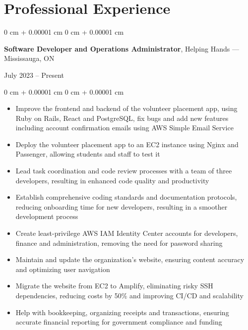 \documentclass[10pt, letterpaper]{article}
\newenvironment{highlights}{
    \begin{itemize}[
        topsep=0.10 cm,
        parsep=0.10 cm,
        partopsep=0pt,
        itemsep=0pt,
        leftmargin=0 cm + 10pt
    ]
}{
    \end{itemize}
} %
\newenvironment{onecolentry}{
    \begin{adjustwidth}{
        0 cm + 0.00001 cm
    }{
        0 cm + 0.00001 cm
    }
}{
    \end{adjustwidth}
} %
\newenvironment{twocolentry}[2][]{
    \onecolentry
    \def\secondColumn{#2}
    \setcolumnwidth{\fill, 4 cm}
    \begin{paracol}{2}
}{
    \switchcolumn \raggedleft \secondColumn
    \end{paracol}
    \endonecolentry
} %
\begin{document}
    \section{Professional Experience}
        \begin{twocolentry}{July 2023 -- Present}
            \textbf{Software Developer and Operations Administrator}, Helping Hands --- Mississauga, ON
        \end{twocolentry}
        \vspace{0.10 cm}
        \begin{onecolentry}
            \begin{highlights}
                \item Improve the frontend and backend of the volunteer placement app, using Ruby on Rails, React and PostgreSQL, fix bugs and add new features including account confirmation emails using AWS Simple Email Service
                \item Deploy the volunteer placement app to an EC2 instance using Nginx and Passenger, allowing students and staff to test it
                \item Lead task coordination and code review processes with a team of three developers, resulting in enhanced code quality and productivity
                \item Establish comprehensive coding standards and documentation protocols, reducing onboarding time for new developers, resulting in a smoother development process
                \item Create least-privilege AWS IAM Identity Center accounts for developers, finance and administration, removing the need for password sharing
                \item Maintain and update the organization's website, ensuring content accuracy and optimizing user navigation
                \item Migrate the website from EC2 to Amplify, eliminating risky SSH dependencies, reducing costs by 50\% and improving CI/CD and scalability
                \item Help with bookkeeping, organizing receipts and transactions, ensuring accurate financial reporting for government compliance and funding
            \end{highlights}
        \end{onecolentry}
        \vspace{0.5 cm}
\end{document}
